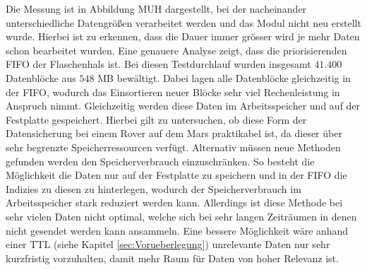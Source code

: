 Die Messung ist in Abbildung MUH dargestellt, bei der nacheinander
unterschiedliche Datengrößen verarbeitet werden und das Modul nicht neu erstellt
wurde. Hierbei ist zu erkennen, dass die Dauer immer grösser wird
je mehr Daten schon bearbeitet wurden. Eine genauere Analyse zeigt, dass die
priorisierenden \gls{FIFO} der Flaschenhals ist. Bei diesen Testdurchlauf
wurden insgesamt $41.400$ Datenblöcke aus $548$ MB bewältigt. Dabei lagen alle
Datenblöcke gleichzeitig in der \gls{FIFO}, wodurch das Einsortieren neuer
Blöcke sehr viel Rechenleistung in Anspruch nimmt. Gleichzeitig werden diese
Daten im Arbeitsspeicher und auf der Festplatte gespeichert. Hierbei gilt zu
untersuchen, ob diese Form der Datensicherung bei einem Rover auf dem
Mars praktikabel ist, da dieser über sehr begrenzte Speicherressourcen verfügt.
Alternativ müssen neue Methoden gefunden werden den Speicherverbrauch
einzuschränken. So besteht die Möglichkeit die Daten nur auf der Festplatte
zu speichern und in der \gls{FIFO} die Indizies zu diesen zu hinterlegen,
wodurch der Speicherverbrauch im Arbeitsspeicher stark reduziert werden kann.
Allerdings ist diese Methode bei sehr vielen Daten nicht optimal, welche sich
bei sehr langen Zeiträumen in denen nicht gesendet werden kann ansammeln.
Eine bessere Möglichkeit wäre anhand einer TTL (siehe Kapitel \ref{sec:Vorueberlegung})
unrelevante Daten nur sehr kurzfristig vorzuhalten, damit mehr Raum für Daten
von hoher Relevanz ist.
